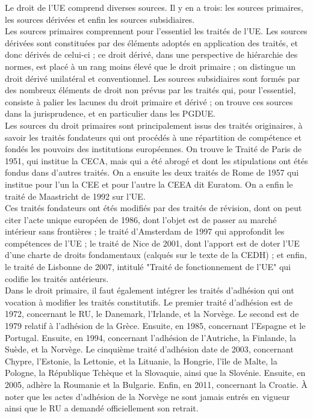 \documentclass[10pt, a4paper, openany]{book}
\begin{document}
Le droit de l'UE comprend diverses sources. Il y en a trois: les sources primaires, les sources dérivées et enfin les sources subsidiaires. \\
Les sources primaires comprennent pour l'essentiel les traités de l'UE. Les sources dérivées sont constituées par des éléments adoptés en application des traités, et donc dérivés de celui-ci ; ce droit dérivé, dans une perspective de hiérarchie des normes, est placé à un rang moins élevé que le droit primaire ; on distingue un droit dérivé unilatéral et conventionnel. Les sources subsidiaires sont formés par des nombreux éléments de droit non prévus par les traités qui, pour l'essentiel, consiste à palier les lacunes du droit primaire et dérivé ; on trouve ces sources dans la jurisprudence, et en particulier dans les PGDUE. \\
Les sources du droit primaires sont principalement issus des traités originaires, à savoir les traités fondateurs qui ont procédés à une répartition de compétence et fondés les pouvoirs des institutions européennes. On trouve le Traité de Paris de 1951, qui institue la CECA, mais qui a été abrogé et dont les stipulations ont étés fondus dans d'autres traités. On a ensuite les deux traités de Rome de 1957 qui institue pour l'un la CEE et pour l'autre la CEEA dit Euratom. On a enfin le traité de Maastricht de 1992 sur l'UE. \\
Ces traités fondateurs ont étés modifiés par des traités de révision, dont on peut citer l'acte unique européen de 1986, dont l'objet est de passer au marché intérieur sans frontières ; le traité d'Amsterdam de 1997 qui approfondit les compétences de l'UE ; le traité de Nice de 2001, dont l'apport est de doter l'UE d'une charte de droits fondamentaux (calqués sur le texte de la CEDH) ; et enfin, le traité de Lisbonne de 2007, intitulé "Traité de fonctionnement de l'UE" qui codifie les traités antérieurs. \\
Dans le droit primaire, il faut également intégrer les traités d'adhésion qui ont vocation à modifier les traités constitutifs. Le premier traité d'adhésion est de 1972, concernant le RU, le Danemark, l'Irlande, et la Norvège. Le second est de 1979 relatif à l'adhésion de la Grèce. Ensuite, en 1985, concernant l'Espagne et le Portugal. Ensuite, en 1994, concernant l'adhésion de l'Autriche, la Finlande, la Suède, et la Norvège. Le cinquième traité d'adhésion date de 2003, concernant Chypre, l'Estonie, la Lettonie, et la Lituanie, la Hongrie, l'île de Malte, la Pologne, la République Tchèque et la Slovaquie, ainsi que la Slovénie. Ensuite, en 2005, adhère la Roumanie et la Bulgarie. Enfin, en 2011, concernant la Croatie. À noter que les actes d'adhésion de la Norvège ne sont jamais entrés en vigueur ainsi que le RU a demandé officiellement son retrait.
\end{document}

